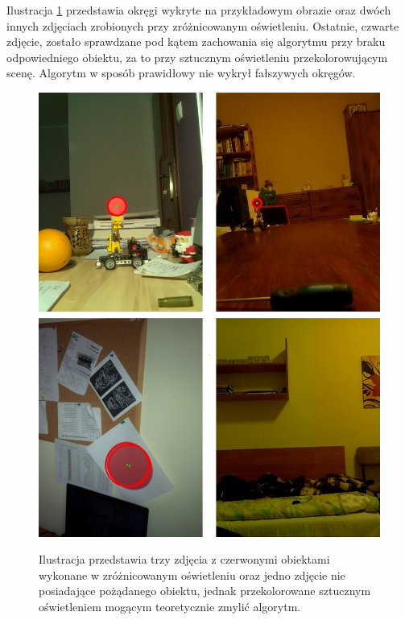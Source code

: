 Ilustracja \ref{przyklady} przedstawia okręgi wykryte na przykładowym obrazie oraz dwóch innych zdjęciach zrobionych przy zróżnicowanym oświetleniu. Ostatnie, czwarte zdjęcie, zostało sprawdzane pod kątem zachowania się algorytmu przy braku odpowiedniego obiektu, za to przy sztucznym oświetleniu przekolorowującym scenę. Algorytm w sposób prawidłowy nie wykrył fałszywych okręgów.\newpage
\begin{figure}[H]
\begin{center}
\includegraphics[scale=0.6]{imgs/circles.jpg}
\caption[Przykładowe efekty końcowe algorytmu wykrywającego okręgi.]\small{Ilustracja przedstawia trzy zdjęcia z czerwonymi obiektami wykonane w zróżnicowanym oświetleniu oraz jedno zdjęcie nie posiadające pożądanego obiektu, jednak przekolorowane sztucznym oświetleniem mogącym teoretycznie zmylić algorytm.}
\label{przyklady}
\end{center}
\end{figure}
